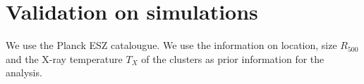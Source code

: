 \section{Validation on simulations}
We use the Planck ESZ catalougue. We use the information on location, size $R_{500}$ and the X-ray temperature $T_X$ of the clusters as prior information for the analysis.